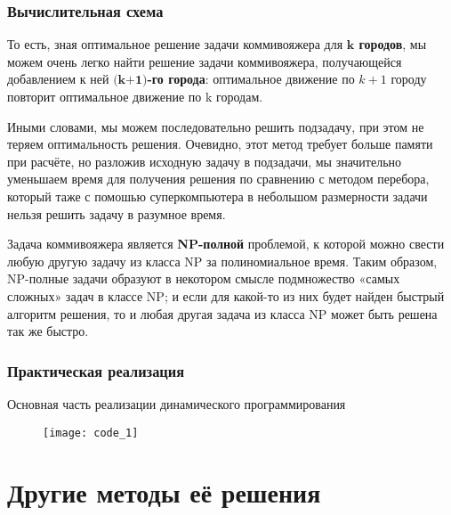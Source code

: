 \documentclass[aspectratio=1610]{beamer}
\begin{document}
  	\begin{frame}
  	\frametitle{Вычислительная схема}
  		То есть, зная оптимальное решение задачи коммивояжера для \textbf{$\textbf{k}$ городов}, мы можем очень легко найти решение задачи коммивояжера, получающейся добавлением к ней \textbf{$\textbf{(k+1)}$-го города}: оптимальное движение по $k+1$ городу повторит оптимальное движение по k городам.
  		\par
  		Иными словами, мы можем последовательно решить подзадачу, при этом не теряем оптимальность решения. Очевидно, этот метод требует больше памяти при расчёте, но разложив исходную задачу в подзадачи, мы значительно уменьшаем время для получения решения по сравнению с методом перебора, который таже с помошью суперкомпьютера в небольшом размерности задачи нельзя решить задачу в разумное время.
  		\par
  		Задача коммивояжера является \textbf{NP-полной} проблемой, к которой можно свести любую другую задачу из класса NP за полиномиальное время. Таким образом, NP-полные задачи образуют в некотором смысле подмножество «самых сложных» задач в классе NP; и если для какой-то из них будет найден быстрый алгоритм решения, то и любая другая задача из класса NP может быть решена так же быстро.
  		
	\end{frame}

	\begin{frame}
	\frametitle{Практическая реализация}
	Основная часть реализации динамического программирования
	\begin{figure}[h]
		\centering
		\texttt{[image: code\_1]}
	\end{figure}
	
	\end{frame}


\section{Другие методы её решения}
\end{document}
